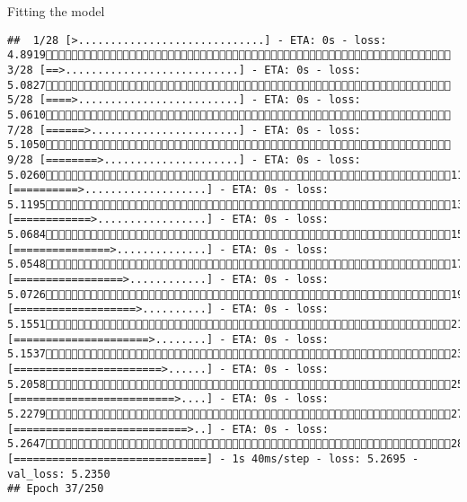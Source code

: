 \documentclass[
  ignorenonframetext,
]{beamer}
\begin{document}
\begin{frame}[fragile]{Fitting the model}
\begin{verbatim}
##  1/28 [>.............................] - ETA: 0s - loss: 4.8919 3/28 [==>...........................] - ETA: 0s - loss: 5.0827 5/28 [====>.........................] - ETA: 0s - loss: 5.0610 7/28 [======>.......................] - ETA: 0s - loss: 5.1050 9/28 [========>.....................] - ETA: 0s - loss: 5.026011/28 [==========>...................] - ETA: 0s - loss: 5.119513/28 [============>.................] - ETA: 0s - loss: 5.068415/28 [===============>..............] - ETA: 0s - loss: 5.054817/28 [=================>............] - ETA: 0s - loss: 5.072619/28 [===================>..........] - ETA: 0s - loss: 5.155121/28 [=====================>........] - ETA: 0s - loss: 5.153723/28 [=======================>......] - ETA: 0s - loss: 5.205825/28 [=========================>....] - ETA: 0s - loss: 5.227927/28 [===========================>..] - ETA: 0s - loss: 5.264728/28 [==============================] - 1s 40ms/step - loss: 5.2695 - val_loss: 5.2350
## Epoch 37/250

\end{verbatim}
\end{frame}
\end{document}
